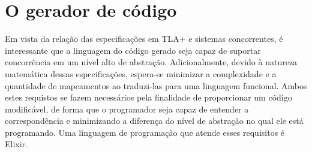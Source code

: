 \chapter{O gerador de código}
\label{cap3}
Em vista da relação das especificações em TLA+ e sistemas concorrentes, é interessante que a linguagem do código gerado seja capaz de suportar concorrência em um nível alto de abstração. Adicionalmente, devido à natureza matemática dessas especificações, espera-se minimizar a complexidade e a quantidade de mapeamentos ao traduzi-las para uma linguagem funcional. Ambos estes requistos se fazem necessários pela finalidade de proporcionar um código modificável, de forma que o programador seja capaz de entender a correspondência e minimizando a diferença do nível de abstração no qual ele está programando. Uma linguagem de programação que atende esses requisitos é Elixir.
